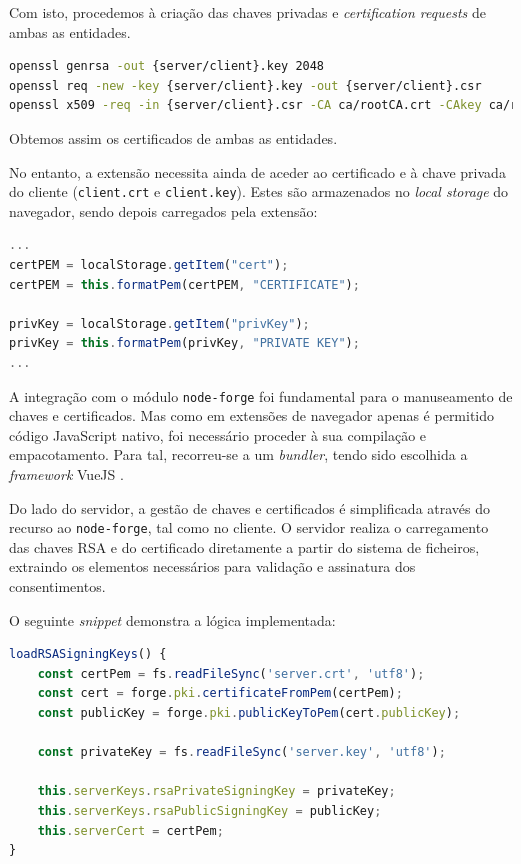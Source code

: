 Com isto, procedemos à criação das chaves privadas e \textit{certification requests} de ambas as entidades.

\begin{lstlisting}[language=sh]
openssl genrsa -out {server/client}.key 2048
openssl req -new -key {server/client}.key -out {server/client}.csr
openssl x509 -req -in {server/client}.csr -CA ca/rootCA.crt -CAkey ca/rootCA.key  -CAcreateserial -out {server/client}.crt -days 825 -sha256
\end{lstlisting}

Obtemos assim os certificados de ambas as entidades.

No entanto, a extensão necessita ainda de aceder ao certificado e à chave privada do cliente (\texttt{client.crt} e \texttt{client.key}). Estes são armazenados no \textit{local storage} do navegador, sendo depois carregados pela extensão:

\begin{lstlisting}[language=Javascript]
...
certPEM = localStorage.getItem("cert");
certPEM = this.formatPem(certPEM, "CERTIFICATE");

privKey = localStorage.getItem("privKey");
privKey = this.formatPem(privKey, "PRIVATE KEY");
...
\end{lstlisting}

A integração com o módulo \texttt{node-forge} foi fundamental para o manuseamento de chaves e certificados. Mas como em extensões de navegador apenas é permitido código JavaScript nativo, foi necessário proceder à sua compilação e empacotamento. Para tal, recorreu-se a um \textit{bundler}, tendo sido escolhida a \textit{framework} VueJS \citep{VueJS}.

Do lado do servidor, a gestão de chaves e certificados é simplificada através do recurso ao \texttt{node-forge}, tal como no cliente. O servidor realiza o carregamento das chaves RSA e do certificado diretamente a partir do sistema de ficheiros, extraindo os elementos necessários para validação e assinatura dos consentimentos.

O seguinte \textit{snippet} demonstra a lógica implementada:

\begin{lstlisting}[language=Javascript]
loadRSASigningKeys() {
	const certPem = fs.readFileSync('server.crt', 'utf8');
	const cert = forge.pki.certificateFromPem(certPem);
	const publicKey = forge.pki.publicKeyToPem(cert.publicKey);

	const privateKey = fs.readFileSync('server.key', 'utf8');

	this.serverKeys.rsaPrivateSigningKey = privateKey;
	this.serverKeys.rsaPublicSigningKey = publicKey;
	this.serverCert = certPem;
}
\end{lstlisting}

